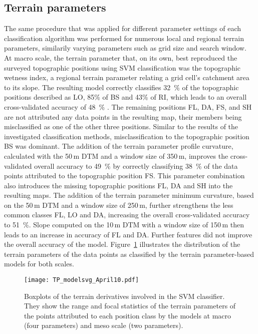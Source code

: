 \documentclass[preprint,12pt,authoryear]{elsarticle}
\begin{document}
\subsection{Terrain parameters}
The same procedure that was applied for different parameter settings of each classification algorithm was performed for  numerous local and regional terrain parameters, similarily varying parameters such as grid size and search window. At macro scale, the terrain parameter that, on its own, best reproduced the surveyed topographic positions using SVM classification was the topographic wetness index, a regional terrain parameter relating a grid cell's catchment area to its slope. The resulting model correctly classifies 32~\% of the topographic positions described as LO, 85\% of BS and 43\% of RI, which leads to an overall cross-validated accuracy of 48~\% . The remaining positions FL, DA, FS, and SH are not attributed any data points in the resulting map, their members being misclassified as one of the other three positions. Similar to the results of the investigated classification methods, misclassification to the topographic position BS was dominant. The addition of the terrain parameter profile curvature, calculated with the 50\,m DTM and a window size of 350\,m, improves the cross-validated overall accuracy to 49~\% by correctly classifying 38~\% of the data points attributed to the topographic position FS. This parameter combination also introduces the missing topographic positions FL, DA and SH into the resulting maps. The addition of the terrain parameter minimum curvature, based on the 50\,m DTM and a window size of 250\,m, further strengthens the less common classes FL, LO and DA, increasing the overall cross-validated accuracy to 51~\%. Slope computed on the 10\,m DTM with a window size of 150\,m then leads to an increase in accuracy of FL and DA. Further features did not improve the overall accuracy of the model. Figure~\ref{fig:tp_model} illustrates the distribution of the terrain parameters of the data points as classified by the terrain parameter-based models for both scales.

\begin{figure}
\texttt{[image: TP\_modelsvg\_April10.pdf]}
\caption{Boxplots of the terrain derivatives involved in the SVM classifier. They show the range and focal statistics of the terrain parameters of the points attributed to each position class by the models at macro (four parameters) and meso scale (two parameters).}
\label{fig:tp_model}
\end{figure}
\end{document}
